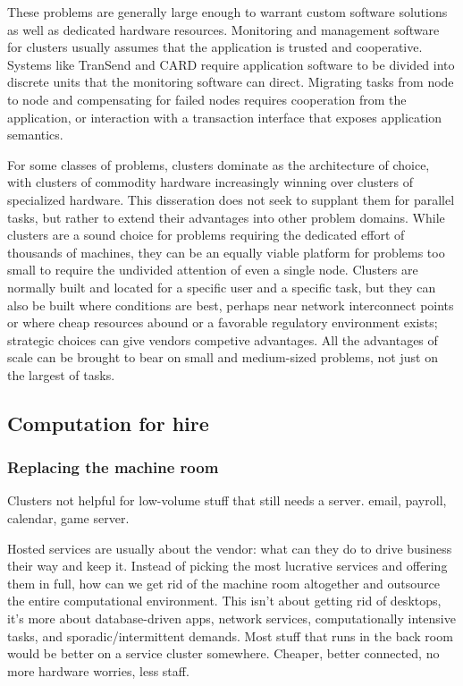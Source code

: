 These problems are generally large enough to warrant custom software solutions as well as dedicated hardware resources. Monitoring and management software for clusters usually assumes that the application is trusted and cooperative. Systems like TranSend \cite{fox} and CARD \cite{anderson97} require application software to be divided into discrete units that the monitoring software can direct. Migrating tasks from node to node and compensating for failed nodes requires cooperation from the application, or interaction with a transaction interface that exposes application semantics.

For some classes of problems, clusters dominate as the architecture of choice, with clusters of commodity hardware increasingly winning over clusters of specialized hardware. This disseration does not seek to supplant them for parallel tasks, but rather to extend their advantages into other problem domains. While clusters are a sound choice for problems requiring the dedicated effort of thousands of machines, they can be an equally viable platform for problems too small to require the undivided attention of even a single node. Clusters are normally built and located for a specific user and a specific task, but they can also be built where conditions are best, perhaps near network interconnect points or where cheap resources abound or a favorable regulatory environment exists; strategic choices can give vendors competive advantages. All the advantages of scale can be brought to bear on small and medium-sized problems, not just on the largest of tasks.

\subsection{Computation for hire}

\subsubsection{Replacing the machine room}

Clusters not helpful for low-volume stuff that still needs a server. email, payroll, calendar, game server.

Hosted services are usually about the vendor: what can they do to drive business their way and keep it. Instead of picking the most lucrative services and offering them in full, how can we get rid of the machine room altogether and outsource the entire computational environment. This isn't about getting rid of desktops, it's more about database-driven apps, network services, computationally intensive tasks, and sporadic/intermittent demands. Most stuff that runs in the back room would be better on a service cluster somewhere. Cheaper, better connected, no more hardware worries, less staff.


